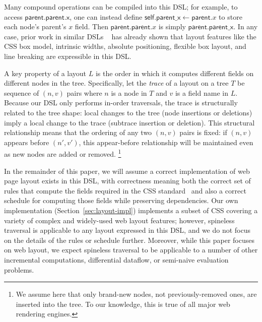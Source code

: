 Many compound operations can be compiled into this DSL;
  for example, to access $\mathsf{parent}.\mathsf{parent}.\mathsf{x}$,
  one can instead define
  $\mathsf{self}.\mathsf{parent\_x} \gets \mathsf{parent}.x$
  to store each node's parent's $x$ field.
Then $\mathsf{parent}.\mathsf{parent}.x$
  is simply $\mathsf{parent}.\mathsf{parent\_x}$.
In any case, prior work in similar DSLs%
  ~\cite{meyerovich-1, meyerovich-2, cassius-1,
  cassius-2, cassius-3, yufeng-1, yufeng-2}
  has already shown that layout features
  like the CSS box model, intrinsic widths,
  absolute positioning, flexible box layout,
  and line breaking are expressible in this DSL.

A key property of a layout $L$
  is the order in which it computes
  different fields on different nodes in the tree.
Specifically, let the \emph{trace} of a layout on a tree $T$
  be sequence of $(n, v)$ pairs
  where $n$ is a node in $T$ and $v$ is a field name in $L$.
Because our DSL only performs in-order traversals,
  the trace is structurally related to the tree shape:
  local changes to the tree (node insertions or deletions)
  imply a local change to the trace (subtrace insertion or deletion).
This structural relationship means
  that the ordering of any two $(n, v)$ pairs is fixed:
  if $(n, v)$ appears before $(n', v')$,
  this appear-before relationship
  will be maintained even as new nodes are added or removed.%
\footnote{
  We assume here that
    only brand-new nodes, not previously-removed ones,
    are inserted into the tree.
  To our knowledge, this is true of all major web rendering engines.
}

In the remainder of this paper,
  we will assume a correct implementation
  of web page layout exists in this DSL,
  with correctness meaning both the correct set of rules
  that compute the fields required
  in the CSS standard~\cite{css}
  and also a correct schedule for computing those fields
  while preserving dependencies.
Our own implementation (Section~\ref{sec:layout-impl})
  implements a subset of CSS covering a variety
  of complex and widely-used web layout features;
  however, spineless traversal is applicable
  to any layout expressed in this DSL,
  and we do not focus on the details
  of the rules or schedule further.
Moreover, while this paper focuses on web layout,
  we expect spineless traversal to be applicable
  to a number of other incremental computations,
  differential dataflow, or semi-naive evaluation problems.

